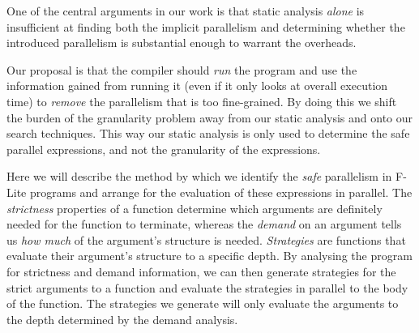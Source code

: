 One of the central arguments in our work is that static analysis \emph{alone}
is insufficient at finding both the implicit parallelism and determining whether
the introduced parallelism is substantial enough to warrant the overheads.

Our proposal is that the compiler should \emph{run} the program and use the
information gained from running it (even if it only looks at overall execution
time) to \emph{remove} the parallelism that is too fine-grained. By doing this
we shift the burden of the granularity problem away from our static analysis
and onto our search techniques. This way our static analysis is only used to
determine the safe parallel expressions, and not the granularity of the
expressions.

Here we will describe the method by which we identify the \emph{safe}
parallelism in F-Lite programs and arrange for the evaluation of these
expressions in parallel. The \emph{strictness} properties of a function
determine which arguments are definitely needed for the function to terminate,
whereas the \emph{demand} on an argument tells us \emph{how much} of the
argument's structure is needed. \emph{Strategies} are functions that evaluate
their argument's structure to a specific depth. By analysing the program for
strictness and demand information, we can then generate strategies for the
strict arguments to a function and evaluate the strategies in parallel to the
body of the function. The strategies we generate will only evaluate the
arguments to the depth determined by the demand analysis.
